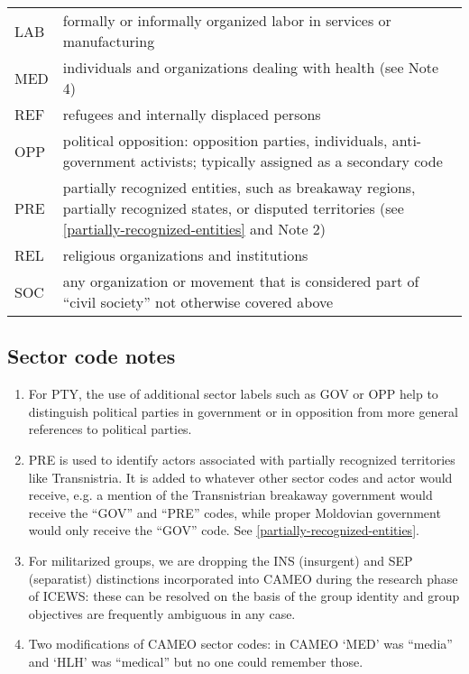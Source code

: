 \documentclass[11pt]{report}
\begin{document}
\begin{center}
\begin{longtable}{|l|p{13cm}|}
      LAB & formally or informally organized labor in services or manufacturing \\
	  MED & individuals and organizations dealing with health (see Note 4) \\
	  REF & refugees and internally displaced persons \\
	  OPP & political opposition: opposition parties, individuals, anti-government activists; typically assigned as a secondary code \\
      PRE & partially recognized entities, such as breakaway regions, partially recognized states, or disputed territories (see \autoref{partially-recognized-entities} and Note 2)  \\
	  REL & religious organizations and institutions \\
	  SOC & any organization or movement that is considered part of ``civil society''  not otherwise covered above\\
  \hline
\end{longtable}
\end{center}

\subsection{Sector code notes}

\begin{enumerate}
\item For PTY, the use of additional sector labels such as GOV or OPP help to distinguish political parties in government or in opposition from more general references to political parties.
\item PRE is used to identify actors associated with partially recognized territories like Transnistria. It is added to whatever other sector codes and actor would receive, e.g. a mention of the Transnistrian breakaway government would receive the ``GOV'' and ``PRE'' codes, while proper Moldovian government would only receive the ``GOV'' code. See \autoref{partially-recognized-entities}.
\item For militarized groups, we are dropping the INS (insurgent) and SEP (separatist) distinctions incorporated into CAMEO during the research phase of ICEWS: these can be resolved on the basis of the group identity and group objectives are frequently ambiguous in any case.
\item Two modifications of CAMEO sector codes: in CAMEO `MED' was ``media'' and `HLH' was ``medical'' but no one could remember those.
\end{enumerate}
\end{document}
